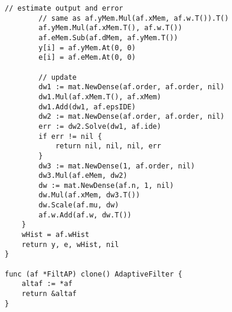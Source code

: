 \begin{lstlisting}[caption=ap.go,label=ap.go]
        // estimate output and error
        // same as af.yMem.Mul(af.xMem, af.w.T()).T()
        af.yMem.Mul(af.xMem.T(), af.w.T())
        af.eMem.Sub(af.dMem, af.yMem.T())
        y[i] = af.yMem.At(0, 0)
        e[i] = af.eMem.At(0, 0)

        // update
        dw1 := mat.NewDense(af.order, af.order, nil)
        dw1.Mul(af.xMem.T(), af.xMem)
        dw1.Add(dw1, af.epsIDE)
        dw2 := mat.NewDense(af.order, af.order, nil)
        err := dw2.Solve(dw1, af.ide)
        if err != nil {
            return nil, nil, nil, err
        }
        dw3 := mat.NewDense(1, af.order, nil)
        dw3.Mul(af.eMem, dw2)
        dw := mat.NewDense(af.n, 1, nil)
        dw.Mul(af.xMem, dw3.T())
        dw.Scale(af.mu, dw)
        af.w.Add(af.w, dw.T())
    }
    wHist = af.wHist
    return y, e, wHist, nil
}

func (af *FiltAP) clone() AdaptiveFilter {
    altaf := *af
    return &altaf
}

\end{lstlisting}

